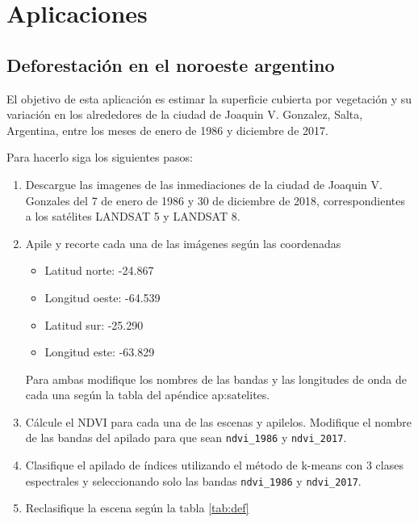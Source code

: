 \chapter{Aplicaciones}

\section{Deforestación en el noroeste argentino}

El objetivo de esta aplicación es estimar la superficie cubierta por vegetación y su variación en los alrededores de la ciudad de Joaquin V. Gonzalez, Salta, Argentina, entre los meses de enero de 1986 y diciembre de 2017.

Para hacerlo siga los siguientes pasos:

\begin{enumerate}
\item Descargue las imagenes de las inmediaciones de la ciudad de Joaquin V. Gonzales del 7 de enero de 1986 y 30 de diciembre de 2018, correspondientes a los satélites LANDSAT 5 y LANDSAT 8.

\item Apile y recorte cada una de las imágenes según las coordenadas

\begin{itemize}
    \item Latitud norte: -24.867
    \item Longitud oeste: -64.539
    \item Latitud sur: -25.290
    \item Longitud este: -63.829
\end{itemize}

Para ambas modifique los nombres de las bandas y las longitudes de onda de cada una según la tabla del apéndice ap:satelites.

\item Cálcule el NDVI para cada una de las escenas y apilelos. Modifique el nombre de las bandas del apilado para que sean \texttt{ndvi\_1986} y \texttt{ndvi\_2017}.

\item Clasifique el apilado de índices utilizando el método de k-means con 3 clases espectrales y seleccionando solo las bandas \texttt{ndvi\_1986} y \texttt{ndvi\_2017}.

\item Reclasifique la escena según la tabla \ref{tab:def}


\end{enumerate}
